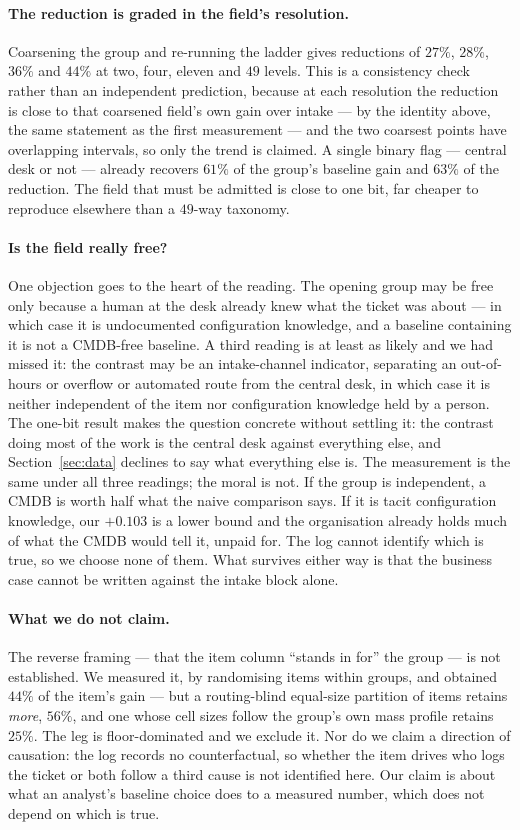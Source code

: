 \documentclass[preprint,12pt]{elsarticle}
\begin{document}
\paragraph{The reduction is graded in the field's resolution.}
Coarsening the group and re-running the ladder gives reductions of $27\%$,
$28\%$, $36\%$ and $44\%$ at two, four, eleven and $49$ levels. This is a
consistency check rather than an independent prediction, because at each
resolution the reduction is close to that coarsened field's own gain over
intake --- by the identity above, the same statement as the first
measurement --- and the two coarsest points have overlapping intervals, so
only the trend is claimed. A single binary flag --- central desk or not ---
already recovers $61\%$ of the group's baseline gain and $63\%$ of the
reduction. The field that must be admitted is close to one bit, far cheaper
to reproduce elsewhere than a $49$-way taxonomy.

\paragraph{Is the field really free?}
One objection goes to the heart of the reading. The opening group may be free
only because a human at the desk already knew what the ticket was about ---
in which case it is undocumented configuration knowledge, and a baseline
containing it is not a CMDB-free baseline. A third reading is at least as
likely and we had missed it: the contrast may be an intake-channel
indicator, separating an out-of-hours or overflow or automated route from the
central desk, in which case it is neither independent of the item nor
configuration knowledge held by a person. The one-bit result makes the
question concrete without settling it: the contrast doing most of the work is
the central desk against everything else, and Section~\ref{sec:data} declines
to say what everything else is. The measurement is the same under all three
readings; the moral is not. If the group is independent, a CMDB is worth half
what the naive comparison says. If it is tacit configuration knowledge, our
$+0.103$ is a lower bound and the organisation already holds much of what the
CMDB would tell it, unpaid for. The log cannot identify which is true, so we
choose none of them. What survives either way is that the business case
cannot be written against the intake block alone.

\paragraph{What we do not claim.}
The reverse framing --- that the item column ``stands in for'' the group ---
is not established. We measured it, by randomising items within groups, and
obtained $44\%$ of the item's gain --- but a routing-blind equal-size
partition of items retains \emph{more}, $56\%$, and one whose cell sizes
follow the group's own mass profile retains $25\%$. The leg is floor-dominated and we exclude it. Nor do we claim
a direction of causation: the log records no counterfactual, so whether the
item drives who logs the ticket or both follow a third cause is not
identified here. Our claim is about what an analyst's baseline choice does
to a measured number, which does not depend on which is true.
\end{document}
